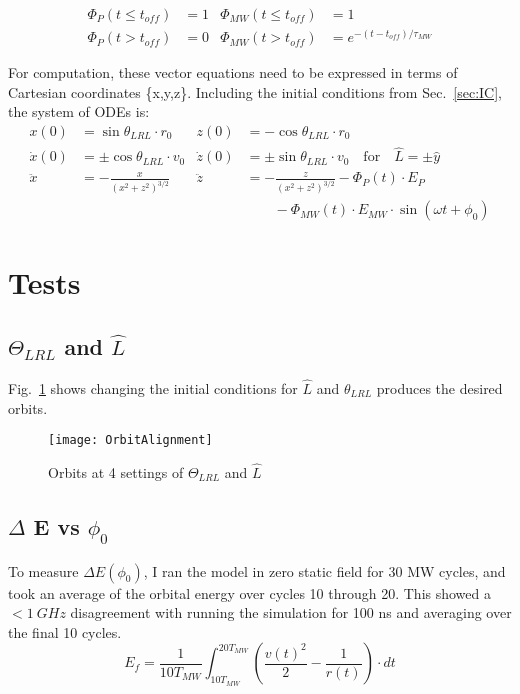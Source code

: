\documentclass[aps,pra,preprint,groupedaddress]{revtex4-1}
\begin{document}
\begin{align*}
\Phi_P(t \leq t_{off}) & = 1 & \Phi_{MW}(t \leq t_{off}) & = 1 \\
\Phi_P(t > t_{off}) & = 0 & \Phi_{MW}(t > t_{off}) & = e^{-(t-t_{off})/\tau_{MW}}
\end{align*}

For computation, these vector equations need to be expressed in terms of Cartesian coordinates \{x,y,z\}. Including the initial conditions from Sec.~\ref{sec:IC}, the system of ODEs is:
\begin{align*}
x(0) & = \sin{\theta_{LRL}} \cdot r_0 & z(0) & = -\cos{\theta_{LRL}} \cdot r_0 \\
\dot{x}(0) & = \pm \cos{\theta_{LRL}} \cdot v_0 & \dot{z}(0) & = \pm \sin{\theta_{LRL}} \cdot v_0 \quad \text{for} \quad \hat{L} = \pm \hat{y} \\
\ddot{x} & = -\frac{x}{(x^2 + z^2)^{3/2}} & \ddot{z} & = -\frac{z}{(x^2 + z^2)^{3/2}} - \Phi_P(t) \cdot E_P \\
 & & & \quad \quad - \Phi_{MW}(t) \cdot E_{MW} \cdot \sin{(\omega t + \phi_0)}
\end{align*}

\section{\label{sec:Tests} Tests}

\subsection{\label{sec:ThL} $\Theta_{LRL}$ and $\hat{L}$}

Fig.~\ref{fig:ThL} shows changing the initial conditions for $\hat{L}$ and $\theta_{LRL}$ produces the desired orbits.

\begin{figure}
	\texttt{[image: OrbitAlignment]}
	\caption{Orbits at 4 settings of $\Theta_{LRL}$ and $\hat{L}$}
	\label{fig:ThL}
\end{figure}

\subsection{\label{sec:EvP} $\Delta$ E vs $\phi_0$}

To measure $\Delta E(\phi_0)$, I ran the model in zero static field for 30 MW cycles, and took an average of the orbital energy over cycles 10 through 20. This showed a $<1 ~ GHz$ disagreement with running the simulation for 100 ns and averaging over the final 10 cycles.
\begin{equation*}
E_f = \frac{1}{10T_{MW}} \int_{10T_{MW}}^{20T_{MW}} \left(\frac{v(t)^2}{2} - \frac{1}{r(t)}\right) \cdot dt
\end{equation*}
\end{document}
